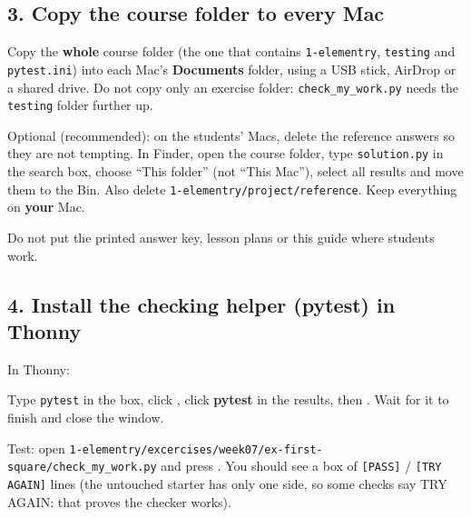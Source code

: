 \documentclass[level=1,teacher]{kidscode}
\begin{document}
\subsection{3. Copy the course folder to every Mac}
\begin{checklist}
  \item Copy the \textbf{whole} course folder (the one that contains \texttt{1-elementry},
        \texttt{testing} and \texttt{pytest.ini}) into each Mac's \textbf{Documents} folder, using a USB
        stick, AirDrop or a shared drive. Do not copy only an exercise folder: \texttt{check\_my\_work.py}
        needs the \texttt{testing} folder further up.
  \item Optional (recommended): on the students' Macs, delete the reference answers so they are not
        tempting. In Finder, open the course folder, type \texttt{solution.py} in the search box, choose
        \enquote{This folder} (not \enquote{This Mac}), select all results and move them to the Bin.
        Also delete \texttt{1-elementry/\allowbreak{}project/\allowbreak{}reference}. Keep everything on \textbf{your} Mac.
  \item Do not put the printed answer key, lesson plans or this guide where students work.
\end{checklist}

\subsection{4. Install the checking helper (pytest) in Thonny}
\begin{checklist}
  \item In Thonny: 
  \item Type \texttt{pytest} in the box, click , click \textbf{pytest} in the results,
        then . Wait for it to finish and close the window.
  \item Test: open \texttt{1-elementry/\allowbreak{}excercises/\allowbreak{}week07/\allowbreak{}ex-first-square/\allowbreak{}check\_my\_work.py} and press
        . You should see a box of \texttt{[PASS]} / \texttt{[TRY AGAIN]} lines (the untouched
        starter has only one side, so some checks say TRY AGAIN: that proves the checker works).
\end{checklist}
\end{document}
